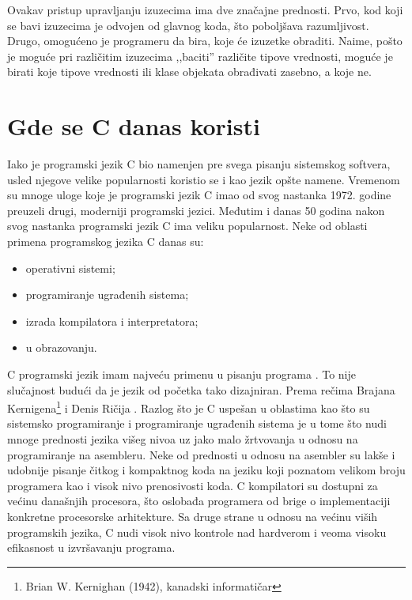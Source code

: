 \documentclass[a4paper]{article}
\begin{document}
{Ovakav pristup upravljanju izuzecima ima dve značajne prednosti. Prvo, kod koji se bavi izuzecima je odvojen od glavnog koda, što poboljšava razumljivost. Drugo, omogućeno je programeru da bira, koje će izuzetke obraditi. Naime, pošto je moguće pri različitim izuzecima ,,baciti'' različite tipove vrednosti, moguće je birati koje tipove vrednosti ili klase objekata obrađivati zasebno, a koje ne.


\section{Gde se C danas koristi}
Iako je programski jezik C bio namenjen pre svega pisanju sistemskog softvera, usled njegove velike popularnosti koristio se i kao jezik opšte namene. Vremenom su mnoge uloge koje je programski jezik C imao od svog nastanka 1972. godine preuzeli drugi, moderniji programski jezici. Međutim i danas 50 godina nakon svog nastanka programski jezik C ima veliku popularnost. Neke od oblasti primena programskog jezika C danas su:
\begin{itemize}
    \item operativni sistemi;
    \item programiranje ugrađenih sistema;
    \item izrada kompilatora i interpretatora;
    \item u obrazovanju.
\end{itemize}
C programski jezik imam najveću primenu u pisanju programa . To nije slučajnost budući da je jezik od početka tako dizajniran. Prema rečima Brajana Kernigena\footnote{Brian W. Kernighan (1942), kanadski informatičar} i Denis Ričija . Razlog što je C uspešan u oblastima kao što su sistemsko programiranje i programiranje ugrađenih sistema je u tome što nudi mnoge prednosti jezika višeg nivoa uz jako malo žrtvovanja u odnosu na programiranje na asembleru. Neke od prednosti u odnosu na asembler su lakše i udobnije pisanje čitkog i kompaktnog koda na jeziku koji poznatom velikom broju programera kao i visok nivo prenosivosti koda. C kompilatori su dostupni za većinu današnjih procesora, što oslobađa programera od brige o implementaciji konkretne procesorske arhitekture. Sa druge strane u odnosu na većinu viših programskih jezika, C nudi visok nivo kontrole nad hardverom i veoma visoku efikasnost u izvršavanju programa.

}
\end{document}
